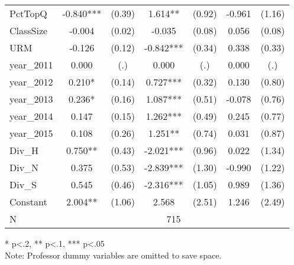 \begin{sidewaystable}[htb]
\begin{threeparttable}
\begin{tabular}{l|c|c|c|c|c|c}
      PctTopQ           & -0.840***                    & (0.39)                       & 1.614**              & (0.92)               & -0.961               & (1.16)               \\
      ClassSize         & -0.004                       & (0.02)                       & -0.035               & (0.08)               & 0.056                & (0.08)               \\
      URM               & -0.126                       & (0.12)                       & -0.842***            & (0.34)               & 0.338                & (0.33)               \\
      year\_2011         & 0.000                        & (.)                          & 0.000                & (.)                  & 0.000                & (.)                  \\
      year\_2012         & 0.210*                       & (0.14)                       & 0.727***             & (0.32)               & 0.130                & (0.80)               \\
      year\_2013         & 0.236*                       & (0.16)                       & 1.087***             & (0.51)               & -0.078               & (0.76)               \\
      year\_2014         & 0.147                        & (0.15)                       & 1.262***             & (0.49)               & 0.245                & (0.77)               \\
      year\_2015         & 0.108                        & (0.26)                       & 1.251**              & (0.74)               & 0.031                & (0.87)               \\
      Div\_H            & 0.750**                      & (0.43)                       & -2.021***            & (0.96)               & 0.022                & (1.34)               \\
      Div\_N            & 0.375                        & (0.53)                       & -2.839***            & (1.30)               & -0.990               & (1.22)               \\
      Div\_S            & 0.545                        & (0.46)                       & -2.316***            & (1.05)               & 0.989                & (1.36)               \\
      Constant          & 2.004**                      & (1.06)                       & 2.568                & (2.51)               & 1.246                & (2.49)               \\
      \hline
      N & \multicolumn{6}{|c}{715} \\
      \hline
      \hline
    \end{tabular}
    \begin{tablenotes}
    \item{* p<.2, ** p<.1, *** p<.05 \\ Note: Professor dummy variables are omitted to save space.}
    \end{tablenotes}
  \end{threeparttable}
\end{sidewaystable}

